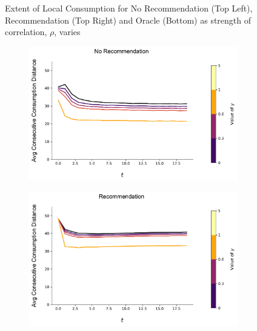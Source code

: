 \documentclass[format=acmsmall, review=false]{acmart}
\begin{document}
\begin{figure}[t]
\begin{subfigure}{.45\textwidth}
\end{subfigure}
\caption{Extent of Local Consumption for No Recommendation (Top Left), Recommendation (Top Right) and Oracle (Bottom) as strength of correlation, $\rho$, varies}
\label{fig:local_consumption_across_rho}
\end{figure}


\begin{figure}[t]
\begin{subfigure}{.45\textwidth}
\includegraphics[width=\linewidth]{figures/gamma_consumption_dist_N_200T_20.pdf}
\end{subfigure}
\begin{subfigure}{.45\textwidth}
\includegraphics[width=\linewidth]{figures/gamma_consumption_dist_N_200T_20_partial.pdf}
\end{subfigure}\\
\begin{subfigure}{.45\textwidth}

\end{subfigure}
\end{figure}
\end{document}
